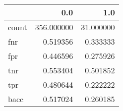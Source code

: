 \begin{tabular}{lrr}
\toprule
{} &         0.0 &        1.0 \\
\midrule
count &  356.000000 &  31.000000 \\
fnr   &    0.519356 &   0.333333 \\
fpr   &    0.446596 &   0.275926 \\
tnr   &    0.553404 &   0.501852 \\
tpr   &    0.480644 &   0.222222 \\
bacc  &    0.517024 &   0.260185 \\
\bottomrule
\end{tabular}
